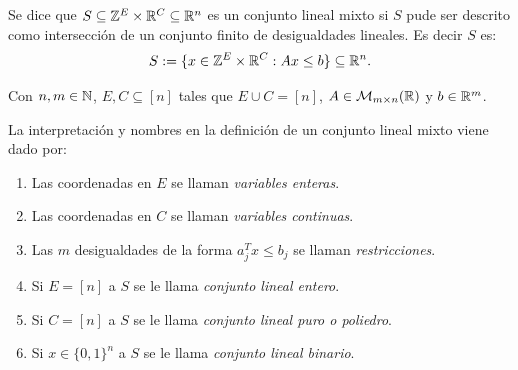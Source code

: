 \begin{defi} Se dice que $S \subseteq \mathbb Z^{E} \times \mathbb R^{C} \subseteq \mathbb R^{n}$ es un conjunto lineal mixto si $S$ pude ser descrito como intersección de un conjunto finito de desigualdades lineales. Es decir $S$ es:
\[
S:=\{x \in \mathbb Z^{E} \times \mathbb R^{C} : Ax \leq b\} \subseteq \mathbb R^{n}.
\]

Con $n,m \in \mathbb N$, $E,C \subseteq [n]$ tales que $E \cup C = [n]$, $A \in \mathcal{M}_{m \times n}(\mathbb R)$ y $b \in \mathbb R^{m}$.

La interpretación y nombres en la definición de un conjunto lineal mixto viene dado por:

\begin{enumerate}
    \item Las coordenadas en $E$ se llaman \emph{variables enteras}.
    \item Las coordenadas en $C$ se llaman \emph{variables continuas}.
    \item Las $m$ desigualdades de la forma $a_{j}^{T}x \leq b_{j}$ se llaman \emph{restricciones}.
    \item Si $E=[n]$ a $S$ se le llama \emph{conjunto lineal entero}.
    \item Si $C=[n]$ a $S$ se le llama \emph{conjunto lineal puro o poliedro}.
    \item Si $x \in \{0,1\}^{n}$ a $S$ se le llama \emph{conjunto lineal binario}.
\end{enumerate}
\end{defi}



